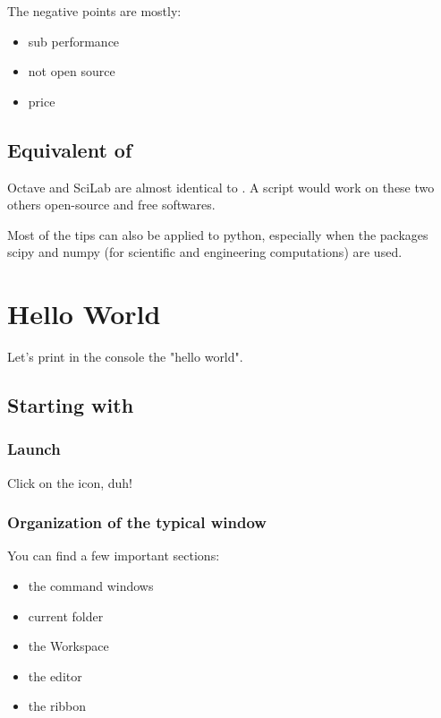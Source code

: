 		The negative points are mostly:
		\begin{itemize}
			\item sub performance
			\item not open source
			\item {\color{red} price}
		\end{itemize}

	\subsection{Equivalent of \matlab }

		Octave and SciLab are almost identical to \matlab. A \matlab script would work on these two others open-source and free softwares.

		Most of the tips can also be applied to python, especially when the packages scipy and numpy (for scientific and engineering computations) are used.


\section{Hello World}
	Let's print in the console the "hello world".
	\subsection{Starting with \matlab}
		\subsubsection{Launch \matlab}
		Click on the icon, duh!
		
		\subsubsection{Organization of the typical \matlab window}

		You can find a few important sections:
		\begin{itemize}
			\item the command windows \\
			\item current folder \\
			\item the Workspace \\
			\item the editor \\
			\item the ribbon \\
		\end{itemize}

